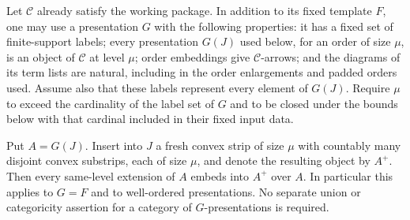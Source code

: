 \begin{proposition}
\label{calc:universal-strip}
Let $\mathcal C$ already satisfy the working package.  In addition to
its fixed template $F$, one may use a presentation $G$ with the
following properties: it has a fixed set of finite-support labels;
every presentation $G(J)$ used below, for an order of size $\mu$, is
an object of $\mathcal C$ at level $\mu$; order embeddings give
$\mathcal C$-arrows; and the diagrams of its term lists are natural,
including in the order enlargements and padded orders used.  Assume
also that these labels represent every element of $G(J)$.
Require $\mu$ to exceed the cardinality of the label set of $G$ and
to be closed under the bounds below with that cardinal included in
their fixed input data.

Put $A=G(J)$.  Insert into $J$ a fresh convex strip of size $\mu$
with countably many disjoint convex substrips, each of size $\mu$,
and denote the resulting object by $A^+$.  Then every same-level
extension of $A$ embeds into $A^+$ over $A$.  In particular this
applies to $G=F$ and to well-ordered presentations.  No separate
union or categoricity assertion for a category of $G$-presentations
is required.
\end{proposition}

